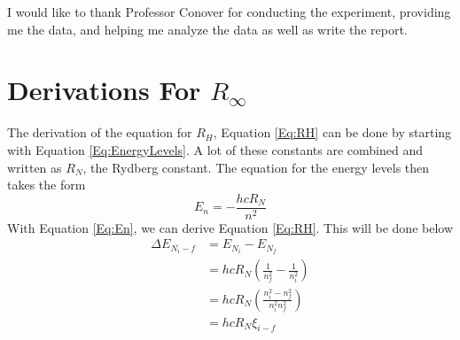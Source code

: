 \documentclass[%
 aps,%
 pra,%
 preprint, %
 amsmath, %
 amsfonts, %
 amssymb, %
]{revtex4-2}
\begin{document}
\begin{acknowledgments}
I would like to thank Professor Conover for conducting the experiment, providing me the data, and helping me analyze the data as well as write the report. 
\end{acknowledgments}















\appendix
\section{\label{app:DerivationsI} Derivations For $ R_{\infty}$}
The derivation of the equation for $R_H$, Equation \ref{Eq:RH} can be done by starting with Equation \ref{Eq:EnergyLevels}. A lot of these constants are combined and written as $R_N$, the Rydberg constant. The equation for the energy levels then takes the form 
\begin{equation}
\label{Eq:En}
    E_n=-\frac{hcR_N}{n^2}
\end{equation}{}
With Equation \ref{Eq:En}, we can derive Equation \ref{Eq:RH}. This will be done below
\begin{align*}
\Delta E_{N_i-f}&=E_{N_i}-E_{N_f}\\
&=hcR_N(\frac{1}{n_f^2}-\frac{1}{n_{i}^2})\\
&=hcR_N(\frac{n_i^2-n_f^2}{n_i^2n_f^2})\\
&=hcR_N\xi_{i-f}
\end{align*}
\end{document}
